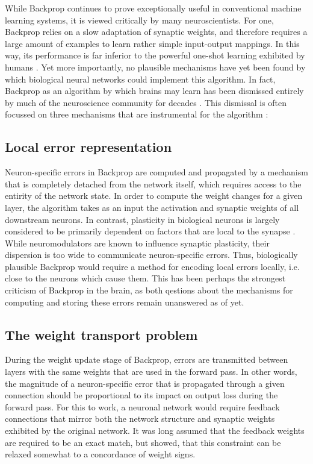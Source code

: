 While Backprop continues to prove exceptionally useful in conventional machine learning systems, it is viewed critically
by many neuroscientists. For one, Backprop relies on a slow adaptation of synaptic weights, and therefore requires a
large amount of examples to learn rather simple input-output mappings. In this way, its performance is far inferior to
the powerful one-shot learning exhibited by humans \citep{Brea2016}. Yet more importantly, no plausible mechanisms have
yet been found by which biological neural networks could implement this algorithm. In fact, Backprop as an algorithm by
which brains may learn has been dismissed entirely by much of the neuroscience community for decades
\citep{Grossberg1987,Crick1989,Mazzoni1991,OReilly1996}. This dismissal is often focussed on three mechanisms that are
instrumental for the algorithm \citep{whittington2019theories,Bengio2015,Liao2016}:



\subsection{Local error representation}

Neuron-specific errors in Backprop are computed and propagated by a mechanism that is completely detached from the
network itself, which requires access to the entirity of the network state. In order to compute the weight changes for a
given layer, the algorithm takes as an input the activation and synaptic weights of all downstream neurons. In contrast,
plasticity in biological neurons is largely considered to be primarily dependent on factors that are local to the
synapse \citep{Abbott2000,magee2020synaptic,urbanczik2014learning}. While neuromodulators are known to influence
synaptic plasticity, their dispersion is too wide to communicate neuron-specific errors\citeme. Thus, biologically
plausible Backprop would require a method for encoding local errors locally, i.e. close to the neurons which cause them.
This has been perhaps the strongest criticism of Backprop in the brain, as both qestions about the mechanisms for
computing and storing these errors remain unanswered as of yet.

\subsection{The weight transport problem}

During the weight update stage of Backprop, errors are transmitted between layers with the same weights that are used in
the forward pass. In other words, the magnitude of a neuron-specific error that is propagated through a given connection
should be proportional to its impact on output loss during the forward pass. For this to work, a neuronal network would
require feedback connections that mirror both the network structure and synaptic weights exhibited by the original
network. It was long assumed that the feedback weights are required to be an exact match, but \citep{Liao2016} showed,
that this constraint can be relaxed somewhat to a concordance of weight signs.

